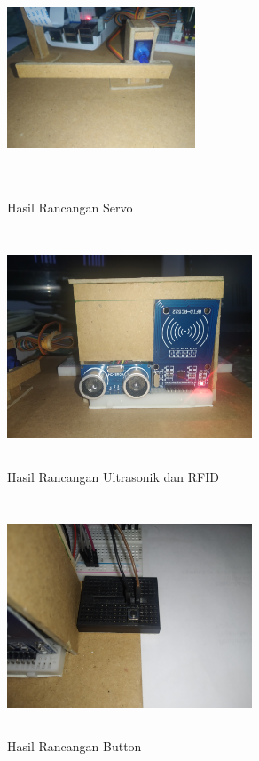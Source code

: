 \begin{figure} [H]
    \includegraphics[height=7cm, width=0.5\textwidth, center]{images/alat-servo.jpg}
    \caption{Hasil Rancangan Servo}
    \label{fig:alatservo}
\end{figure}

\begin{figure} [H]
    \includegraphics[height=7cm, width=0.65\textwidth, center]{images/alat-ultra&rfid.jpg}
    \caption{Hasil Rancangan Ultrasonik dan RFID}
    \label{fig:alatultrarfid}
\end{figure}

\begin{figure} [H]
    \includegraphics[height=7cm, width=0.65\textwidth, center]{images/alat-button.jpg}
    \caption{Hasil Rancangan Button}
    \label{fig:alatbutton}
\end{figure}

